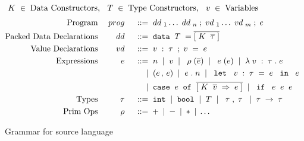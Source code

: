 \begin{figure*}
    \begin{displaymath}
    \; {K} \; \in \; \textup{Data Constructors}, \:\: \; {T} \; \in \; \textup{Type Constructors}, \:\: \; v \; \in \; \textup{Variables}
  \end{displaymath} 
  \begin{displaymath}
    \begin{aligned}
      \textup{Program} && \; {prog} \; && \; ::= \; & \; {dd} \;_1 \ldots \; {dd} \;_n \; ; \; {vd} \;_1 \ldots \; {vd} \;_m \; ; \; {e} \; \\
      \textup{Packed Data Declarations} && \; {dd} \; && \; ::= \; & \; \texttt{data} \; \; {T} \; = \overline{[\; {K} \; \; \overline{\tau}\;]} \\
      \textup{Value Declarations} && \; {vd} \; && \; ::= \; & \; v \; : \; {\tau} \; \; ; \; v \; = \; {e} \; \\ 
      \textup{Expressions} && \; {e} \; && \; ::= \; & \; n \; \; | \; \; v \; \; | \; \; \; {\rho} \;(\overline{e}) \; \; | \; \; \; {e} \;(e) \; \; | \; \; \lambda {\; v\;:\; {\tau} \;} . {\; {e} \;} \; \\
      && && \; | \; & \; ({e} \,,\, {e}) \; \; | \; \; {e} \;.\; n \; \; | \; \;\; \texttt{let} \; \; \; v \;:\; {\tau} \; = \; {e} \; \; \; \texttt{in} \; \; \; {e} \; \; \\
      && && \; | \; & \; \texttt{case} \;\; e\; \; \texttt{of} \;\; \overline{[{\; {K} \; \; \overline{v} \;} \Rightarrow {\; {e} \;}]} \; \; | \;  \; \; \texttt{if} \;\; \; {e} \; \; {e} \; \; {e} \; \; \\
      \textup{Types} && \; {\tau} \; && \; ::= \; & \; \texttt{int} \; \; | \; \; \texttt{bool} \; \; | \; \; {T} \; \; | \; \; {\; {\tau} \;}, {\; {\tau} \;} \; \; | \; \; {\tau} \; \rightarrow \; {\tau} \; \\
      \textup{Prim Ops} && \; {\rho} \; && \; ::= \; & + \; | \; - \; | \; * \; | \; \ldots \\
    \end{aligned}
  \end{displaymath}
  \caption{Grammar for source language}
  \label{fig:source}
\end{figure*}


